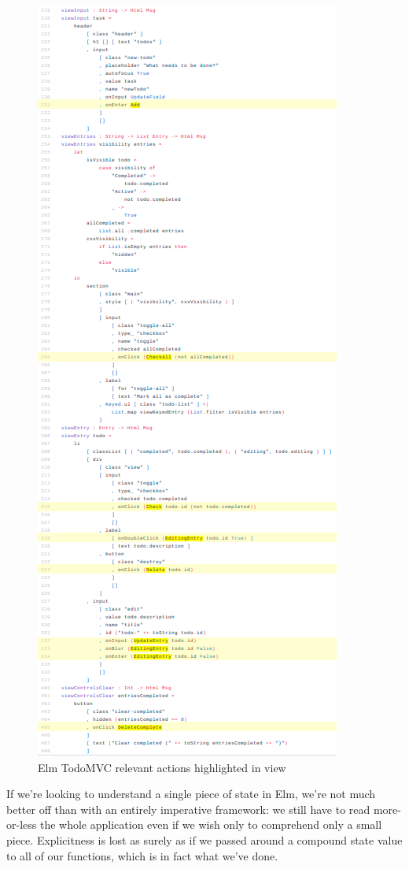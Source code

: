 \documentclass[sigconf]{acmart}
\begin{document}
\begin{figure}[h]
\includegraphics[scale=0.35]{elm-actions}
\caption{Elm TodoMVC relevant actions highlighted in view}
\label{fig:figure 3}
\end{figure}

If we're looking to understand a single piece of state in Elm, we're not much better off than with an entirely imperative framework: we still have to read more-or-less the whole application even if we wish only to comprehend only a small piece. Explicitness is lost as surely as if we passed around a compound state value to all of our functions, which is in fact what we've done.
\end{document}
